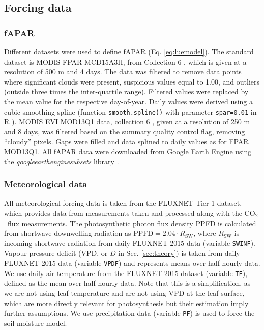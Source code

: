 \documentclass{myreport}
\newcommand{\coo}{CO$_2$}
\begin{document}

\subsection{Forcing data}

\subsubsection{fAPAR}
\label{sec:greennessdata}

Different datasets were used to define fAPAR (Eq. \ref{eq:luemodel}). The standard dataset is MODIS FPAR MCD15A3H, from Collection 6 \citep{modis_fpar_6}, which is given at a resolution of 500 m and 4 days. The data was filtered to remove data points where significant clouds were present, suspicious values equal to 1.00, and outliers (outside three times the inter-quartile range). Filtered values were replaced by the mean value for the respective day-of-year. Daily values were derived using a cubic smoothing spline (function \texttt{smooth.spline()} with parameter \texttt{spar=0.01} in R \citep{Rcoreteam}). MODIS EVI MOD13Q1 data, collection 6 \citep{modis_evi_6}, given at a resolution of 250 m and 8 days, was filtered based on the summary quality control flag, removing ``cloudy'' pixels. Gaps were filled and data splined to daily values as for FPAR MOD13Q1. All fAPAR data were downloaded from Google Earth Engine using the \textit{google\textunderscore earth\textunderscore engine\textunderscore subsets} library \citep{gee_subset}. 

\subsubsection{Meteorological data}
\label{sec:ppfd}
All meteorological forcing data is taken from the FLUXNET Tier 1 dataset, which provides data from measurements taken and processed along with the \coo\ flux measurements. The photosynthetic photon flux density PPFD is calculated from shortwave downwelling radiation as $\text{PPFD} = 2.04 \cdot R_{\text{SW}}$, where $R_{\text{SW}}$ is incoming shortwave radiation from daily FLUXNET 2015 data (variable \texttt{SW\textunderscore IN\textunderscore F}). Vapour pressure deficit (VPD, or $D$ in Sec. \ref{sec:theory}) is taken from daily FLUXNET 2015 data (variable \texttt{VPD\textunderscore F}) and represents means over half-hourly data. We use daily air temperature from the FLUXNET 2015 dataset (variable \texttt{T\textunderscore F}), defined as the mean over half-hourly data. Note that this is a simplification, as we are not using leaf temperature and are not using VPD at the leaf surface, which are more directly relevant for photosynthesis but their estimation imply further assumptions. We use precipitation data (variable \texttt{P\textunderscore F}) is used to force the soil moisture model.
\end{document}
